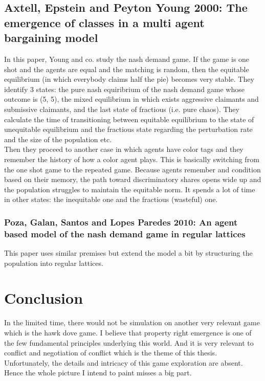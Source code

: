 \documentclass[12.5pt]{report}
\begin{document}
\section{Axtell, Epstein and Peyton Young 2000: The emergence of classes in a multi agent bargaining model}

In this paper, Young and co. study the nash demand game. If the game is one shot and the agents are equal and the matching is random, then the equitable equilibrium (in which everybody claims half the pie) becomes very stable. They identify 3 states: the pure nash equiribrium of the nash demand game whose outcome is (5, 5), the mixed equilibrium in which exists aggressive claimants and submissive claimants, and the last state of fractious (i.e. pure chaos). They calculate the time of transitioning between equitable equilibrium to the state of unequitable equilibrium and the fractious state regarding the perturbation rate and the size of the population etc. \\

Then they proceed to another case in which agents have color tags and they remember the history of how a color agent plays. This is basically switching from the one shot game to the repeated game. Because agents remember and condition based on their memory, the path toward discriminatory shares opens wide up and the population struggles to maintain the equitable norm. It spends a lot of time in other states: the inequitable one and the fractious (wasteful) one.

\subsection{Poza, Galan, Santos and Lopes Paredes 2010: An agent based model of the nash demand game in regular lattices}
This paper uses similar premises but extend the model a bit by structuring the population into regular lattices.


\chapter{Conclusion}
In the limited time, there would not be simulation on another very relevant game which is the hawk dove game. I believe that property right emergence is one of the few fundamental principles underlying this world. And it is very relevant to conflict and negotiation of conflict which is the theme of this thesis. Unfortunately, the details and intricacy of this game exploration are absent. Hence the whole picture I intend to paint misses a big part.\\
\end{document}
